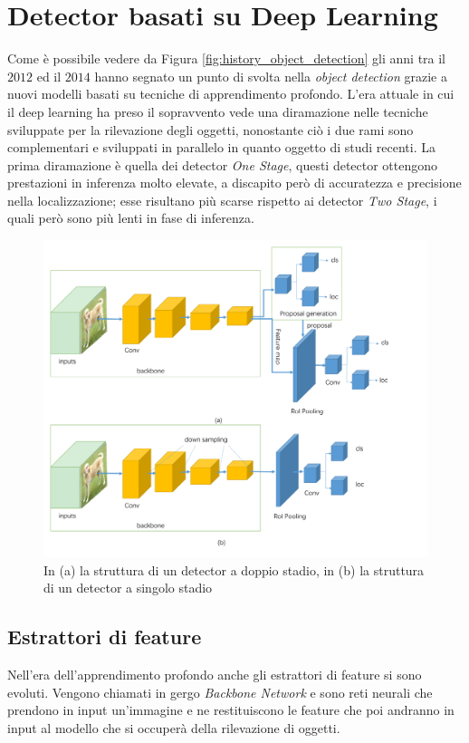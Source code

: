 \section{Detector basati su Deep Learning}
\label{sec:deep_learning_obj}
Come è possibile vedere da Figura \ref{fig:history_object_detection} gli anni tra il $2012$ ed il $2014$ hanno segnato un punto di svolta nella \textit{object detection} grazie a nuovi modelli basati su tecniche di apprendimento profondo. L'era attuale in cui il deep learning ha preso il sopravvento vede una diramazione nelle tecniche sviluppate per la rilevazione degli oggetti, nonostante ciò i due rami sono complementari e sviluppati in parallelo in quanto oggetto di studi recenti. La prima diramazione è quella dei detector \textit{One Stage}, questi detector ottengono prestazioni in inferenza molto elevate, a discapito però di accuratezza e precisione nella localizzazione; esse risultano più scarse rispetto ai detector \textit{Two Stage}, i quali però sono più lenti in fase di inferenza. 
\begin{figure}[]
    \centering
    \includegraphics[width=\textwidth]{images/architectures_one_two_stage.pdf}
    \caption{In (a) la struttura di un detector a doppio stadio, in (b) la struttura di un detector a singolo stadio \cite{DBLP:journals/corr/abs-1907-09408}}
    \label{fig:detector_structure}
\end{figure}

\subsection{Estrattori di feature}
\label{sec:feature_extractor}
Nell'era dell'apprendimento profondo anche gli estrattori di feature si sono evoluti. Vengono chiamati in gergo \textit{Backbone Network} e sono reti neurali che prendono in input un'immagine e ne restituiscono le feature che poi andranno in input al modello che si occuperà della rilevazione di oggetti. 

